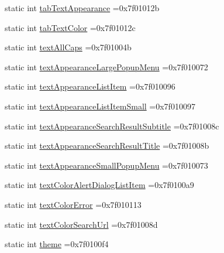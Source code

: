\begin{DoxyCompactItemize}
\item 
static int \hyperlink{classandroid_1_1support_1_1graphics_1_1drawable_1_1R_1_1attr_a610cd5735c6131a48aa0efce0bf69305}{tab\+Text\+Appearance} =0x7f01012b
\item 
static int \hyperlink{classandroid_1_1support_1_1graphics_1_1drawable_1_1R_1_1attr_af43ba39aeb9e771d37055b789021e1b1}{tab\+Text\+Color} =0x7f01012c
\item 
static int \hyperlink{classandroid_1_1support_1_1graphics_1_1drawable_1_1R_1_1attr_a6beee6f2a747fa1b4ca1b2b22a1bcf2b}{text\+All\+Caps} =0x7f01004b
\item 
static int \hyperlink{classandroid_1_1support_1_1graphics_1_1drawable_1_1R_1_1attr_ac41c26e56c3d24c8b3cd1c00adb1de7a}{text\+Appearance\+Large\+Popup\+Menu} =0x7f010072
\item 
static int \hyperlink{classandroid_1_1support_1_1graphics_1_1drawable_1_1R_1_1attr_a4af0c27a177bf8bcc4d19b39996021ef}{text\+Appearance\+List\+Item} =0x7f010096
\item 
static int \hyperlink{classandroid_1_1support_1_1graphics_1_1drawable_1_1R_1_1attr_a610f7ff19ee17f228f57b98f33bc7b68}{text\+Appearance\+List\+Item\+Small} =0x7f010097
\item 
static int \hyperlink{classandroid_1_1support_1_1graphics_1_1drawable_1_1R_1_1attr_aa66e29ef189ab5c15c594a6a6975a79e}{text\+Appearance\+Search\+Result\+Subtitle} =0x7f01008c
\item 
static int \hyperlink{classandroid_1_1support_1_1graphics_1_1drawable_1_1R_1_1attr_a277bab4568ba3ba9f5ce2bbd30df01c0}{text\+Appearance\+Search\+Result\+Title} =0x7f01008b
\item 
static int \hyperlink{classandroid_1_1support_1_1graphics_1_1drawable_1_1R_1_1attr_a3b4c7fe5cbadb4c9b027c2a03e363a25}{text\+Appearance\+Small\+Popup\+Menu} =0x7f010073
\item 
static int \hyperlink{classandroid_1_1support_1_1graphics_1_1drawable_1_1R_1_1attr_ac32aaf1aaaf96e08cca8c4d6bb090736}{text\+Color\+Alert\+Dialog\+List\+Item} =0x7f0100a9
\item 
static int \hyperlink{classandroid_1_1support_1_1graphics_1_1drawable_1_1R_1_1attr_aa76db797cbe85409fcb6b55121ffaec4}{text\+Color\+Error} =0x7f010113
\item 
static int \hyperlink{classandroid_1_1support_1_1graphics_1_1drawable_1_1R_1_1attr_a71b7c58efd9ce4bec525d10f2cc4e3df}{text\+Color\+Search\+Url} =0x7f01008d
\item 
static int \hyperlink{classandroid_1_1support_1_1graphics_1_1drawable_1_1R_1_1attr_af545d01b3d7325084759b9d27f242644}{theme} =0x7f0100f4

\end{DoxyCompactItemize}
